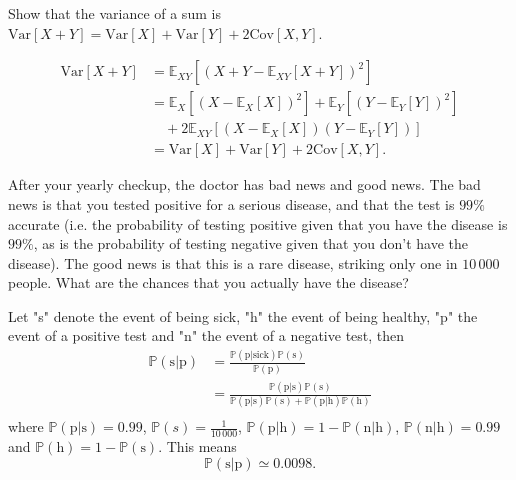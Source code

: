 \begin{example}
	Show that the variance of a sum is $\text{Var}[X+Y]=\text{Var}[X]+\text{Var}[Y]+2\text{Cov}[X,Y]$.
	
	\begin{equation}
		\begin{split}
			\text{Var}[X+Y] &= \mathbb{E}_{XY}[(X+Y-\mathbb{E}_{XY}[X+Y])^2]\\
			&= \mathbb{E}_X[(X-\mathbb{E}_X[X])^2]+\mathbb{E}_Y[(Y-\mathbb{E}_Y[Y])^2]\\
			&\quad+2\mathbb{E}_{XY}[(X-\mathbb{E}_X[X])(Y-\mathbb{E}_Y[Y])]\\
			& = \text{Var}[X]+\text{Var}[Y]+2\text{Cov}[X,Y].
		\end{split}
	\end{equation}
\end{example}
\begin{example}
	After your yearly checkup, the doctor has bad news and good news. The bad news is that you tested positive for a serious disease, and that the test is $99\%$ accurate (i.e. the probability of testing positive given that you have the disease is $99\%$, as is the probability of testing negative given that you don't have the disease). The good news is that this is a rare disease, striking only one in $10\,000$ people. What are the chances that you actually have the disease?\newline
	
	Let "s" denote the event of being sick, "h" the event of being healthy, "p" the event of a positive test and "n" the event of a negative test, then  
	\begin{equation}
		\begin{split}
			\mathbb{P}(\text{s}|\text{p}) &= \frac{\mathbb{P}(\text{p}|\text{sick})\mathbb{P}(\text{s})}{\mathbb{P}(\text{p})}\\
			&= \frac{\mathbb{P}(\text{p}|\text{s})\mathbb{P}(\text{s})}{\mathbb{P}(\text{p}|\text{s})\mathbb{P}(\text{s})+\mathbb{P}(\text{p}|\text{h})\mathbb{P}(\text{h})}\\
		\end{split}
	\end{equation}
	where $\mathbb{P}(\text{p}|\text{s}) = 0.99$, $\mathbb{P}(s) = \frac{1}{10\, 000}$, $\mathbb{P}(\text{p}|\text{h})=1-\mathbb{P}(\text{n}|\text{h})$, $\mathbb{P}(\text{n}|\text{h})=0.99$ and $\mathbb{P}(\text{h})=1-\mathbb{P}(\text{s})$. This means
	\begin{equation}
		\mathbb{P}(\text{s}|\text{p}) \simeq 0.0098.
	\end{equation}		
\end{example}

